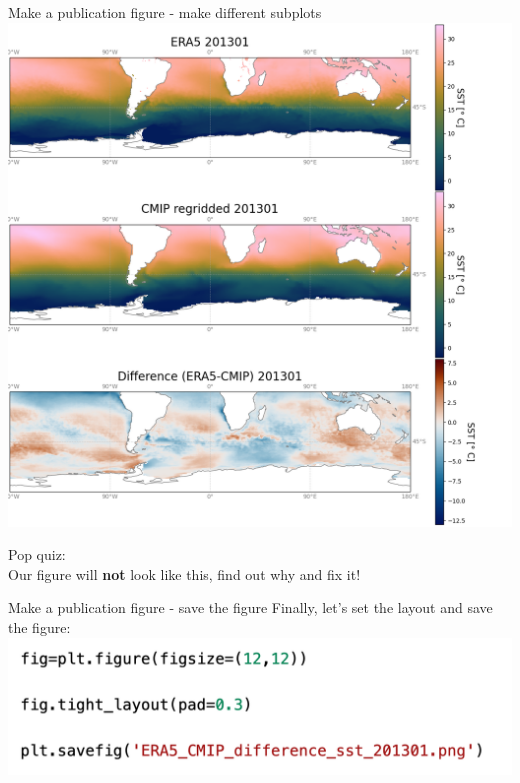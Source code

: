 \begin{frame}{\insertsectionnumber{ |} Make a publication figure - make different subplots} 
    \centering\includegraphics[scale=0.25]{images/script5_fig3.png}
    \begin{beamerboxesrounded}[lower=gray,shadow=true]{
        Pop quiz:\\
        Our figure will \textbf{not} look like this, find out why and fix it!}
    \end{beamerboxesrounded}
\end{frame}


\begin{frame}{\insertsectionnumber{ |} Make a publication figure - save the figure} 
    Finally, let's set the layout and save the figure: \\
        \vspace{0.3cm}
    \includegraphics[scale=0.35]{images/Script5_step8.png}
\end{frame}


